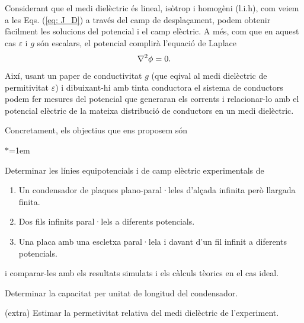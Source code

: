 \documentclass[11pt]{article}
\begin{document}
Considerant que el medi dielèctric és lineal, isòtrop i homogèni (l.i.h), com veiem a les Eqs. (\ref{eq: J_D}) a través del camp de desplaçament, podem obtenir fàcilment les solucions del potencial i el camp elèctric. A més, com que en aquest cas $\varepsilon$ i $g$ són escalars, el potencial complirà l'equació de Laplace
\begin{equation}
    \laplacian{\phi}=0.
\end{equation}
Així, usant un paper de conductivitat $g$ (que eqival al medi dielèctric de permitivitat $\varepsilon$) i dibuixant-hi amb tinta conductora el sistema de conductors podem fer mesures del potencial que generaran els corrents i relacionar-lo amb el potencial elèctric de la mateixa distribució de conductors en un medi dielèctric.  

Concretament, els objectius que ens proposem són 
\begin{list}{$\ast$}{\leftmargin=1em}
    \item Determinar les línies equipotencials i de camp elèctric experimentals de
        \begin{enumerate}{\leftmargin=1em}
            \item  Un condensador de plaques plano-paral·leles d'alçada infinita però llargada finita.
            \item  Dos fils infinits paral·lels a diferents potencials.
            \item  Una placa amb una escletxa paral·lela i davant d'un fil infinit a diferents potencials.
        \end{enumerate}  
        i comparar-les amb els resultats simulats i els càlculs tèorics en el cas ideal.
    \item Determinar la capacitat per unitat de longitud del condensador.
    \item (extra) Estimar la permetivitat relativa del medi dielèctric de l'experiment.
\end{list}
\end{document}
